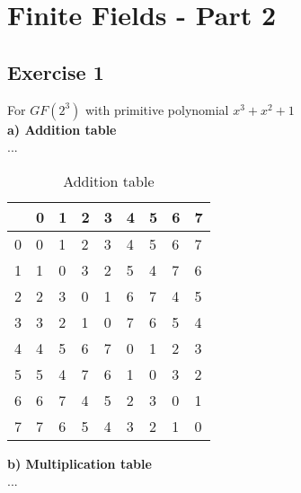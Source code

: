 \section{Finite Fields - Part 2}

\subsection{Exercise 1}
For $GF(2^3)$ with primitive polynomial $x^3+x^2+1$\\

\noindent\textbf{a) Addition table}\\
...
\begin{table}[H]
    \begin{tabularx}{\textwidth}{| Y | Y | Y | Y | Y | Y | Y | Y | Y |}
        \hline
         & 0 & 1 & 2 & 3 & 4 & 5 & 6 & 7 \\\hline
        0 & 0 & 1 & 2 & 3 & 4 & 5 & 6 & 7 \\\hline
        1 & 1 & 0 & 3 & 2 & 5 & 4 & 7 & 6 \\\hline
        2 & 2 & 3 & 0 & 1 & 6 & 7 & 4 & 5 \\\hline
        3 & 3 & 2 & 1 & 0 & 7 & 6 & 5 & 4 \\\hline
        4 & 4 & 5 & 6 & 7 & 0 & 1 & 2 & 3 \\\hline
        5 & 5 & 4 & 7 & 6 & 1 & 0 & 3 & 2 \\\hline
        6 & 6 & 7 & 4 & 5 & 2 & 3 & 0 & 1 \\\hline
        7 & 7 & 6 & 5 & 4 & 3 & 2 & 1 & 0 \\\hline
    \end{tabularx}
    \caption{Addition table}
    \label{tab:ff21a}
\end{table}
\noindent\textbf{b) Multiplication table}\\
...
